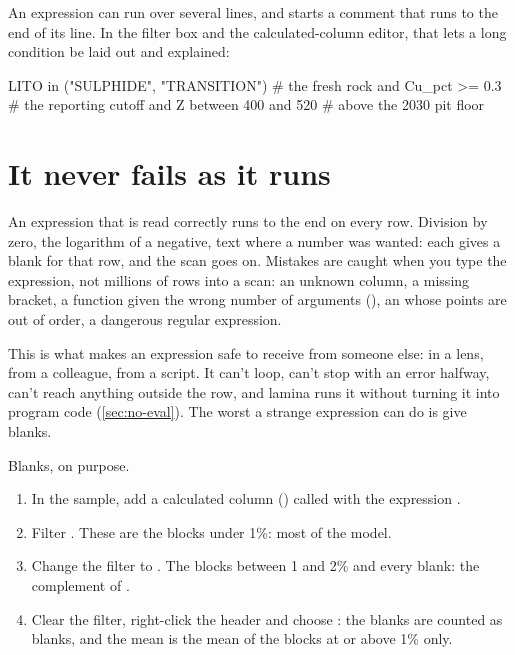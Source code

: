 An expression can run over several lines, and \code{\#} starts a comment that runs to the end of its
line. In the filter box and the calculated-column editor, that lets a long condition be laid out and
explained:

\begin{codeblock}
LITO in ("SULPHIDE", "TRANSITION")   # the fresh rock
and Cu_pct >= 0.3                    # the reporting cutoff
and Z between 400 and 520            # above the 2030 pit floor
\end{codeblock}

\section{It never fails as it runs}\label{sec:totality}

An expression that is read correctly runs to the end on every row. Division by zero, the logarithm of a
negative, text where a number was wanted: each gives a blank for that row, and the scan goes on. Mistakes
are caught when you type the expression, not millions of rows into a scan: an unknown column, a
missing bracket, a function given the wrong number of arguments (), an  whose points are out of order, a dangerous regular expression.

\begin{why}
This is what makes an expression safe to receive from someone else: in a lens, from a colleague, from a
script. It can't loop, can't stop with an error halfway, can't reach anything outside the row, and lamina
runs it without turning it into program code (\cref{sec:no-eval}). The worst a strange expression can do
is give blanks.
\end{why}

\begin{tryit}
Blanks, on purpose.
\begin{enumerate}
\item In the sample, add a calculated column () called  with the expression
.
\item Filter . These are the blocks under 1\%: most of the model.
\item Change the filter to . The blocks between 1 and 2\% and every blank: the
complement of .
\item Clear the filter, right-click the  header and choose : the
blanks are counted as blanks, and the mean is the mean of the blocks at or above 1\% only.
\end{enumerate}
\end{tryit}
